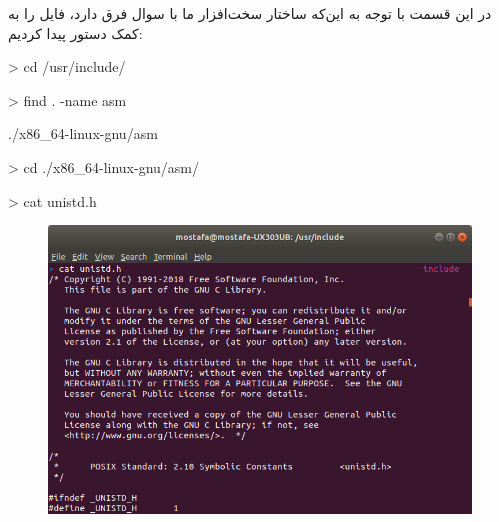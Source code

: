

در این قسمت با توجه به این‌که ساختار سخت‌افزار ما با سوال فرق دارد، فایل  را به کمک دستور  پیدا کردیم:

\begin{code}
	> cd /usr/include/
	
	> find . -name asm
	
	./x86_64-linux-gnu/asm
	
	> cd ./x86_64-linux-gnu/asm/
	
	> cat unistd.h
	
\end{code}

\begin{figure}[h!]
	\centering
	\includegraphics[scale=.4]{img/1.png}
\end{figure}


